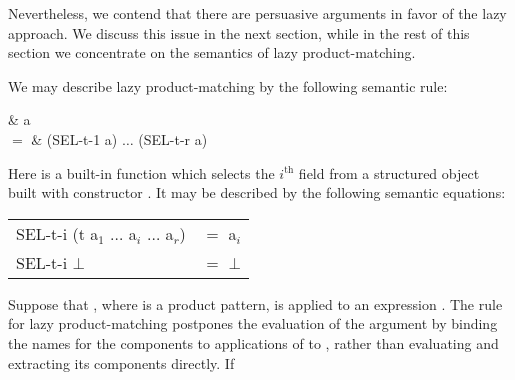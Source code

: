 Nevertheless, we contend that there are persuasive arguments in favor of the lazy approach. We discuss this issue in the next section, while in the rest of this section we concentrate on the semantics of lazy product-matching.

We may describe lazy product-matching by the following semantic rule:

\begin{mlalign}
& a \\
$=$ & (SEL-t-1 a) $\ldots$ (SEL-t-r a)
\end{mlalign}

Here  is a built-in function which selects the $i^\text{th}$ field from a structured object built with constructor . It may be described by the following semantic equations:

\begin{mlcoded}
\begin{tabular}{ll}
    {SEL}-t-i (t a$_1$ $\ldots$ a$_i$ $\ldots$ a$_r$) &$=$ a$_i$ \\
    {SEL}-t-i $\bot$ &$=$ $\bot$
\end{tabular}
\end{mlcoded}
Suppose that , where  is a product pattern, is applied to an expression . The rule for lazy product-matching postpones the evaluation of the argument  by binding the names for the components to applications of  to , rather than evaluating  and extracting its components directly. If